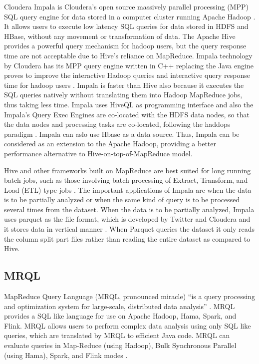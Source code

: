     Cloudera Impala is Cloudera's open source massively parallel
     processing (MPP) SQL query engine for data stored in a computer
     cluster running Apache Hadoop \cite{www-impala-cloudera}. It
     allows users to execute low latency SQL queries for data stored
     in HDFS and HBase, without any movement or transformation of
     data. The Apache Hive provides a powerful query mechanism for
     hadoop users, but the query response time are not acceptable due
     to Hive's reliance on MapReduce. Impala technology by Cloudera
     has its MPP query engine written in C++ replacing the Java engine
     proves to improve the interactive Hadoop queries and interactive
     query response time for hadoop users \cite{www-impala-dummies}
     . Impala is faster than Hive also because it executes the SQL
     queries natively without translating them into Hadoop MapReduce
     jobs, thus taking less time. Impala uses HiveQL as programming
     interface and also the Impala's Query Exec Engines are co-located
     with the HDFS data nodes, so that the data nodes and processing
     tasks are co-located, following the haddops paradigm
     \cite{www-impala-dummies}.  Impala can aslo use Hbase as a data
     source. Thus, Impala can be considered as an extension to the
     Apache Hadoop, providing a better performance alternative to
     Hive-on-top-of-MapReduce model.

     Hive and other frameworks built on MapReduce are best suited for
     long running batch jobs, such as those involving batch processing
     of Extract, Transform, and Load (ETL) type jobs
     \cite{www-impala-cloudera}.  The important applications of
     Impala are when the data is to be partially analyzed or when the
     same kind of query is to be processed several times from the
     dataset. When the data is to be partially analyzed, Impala uses
     parquet as the file format, which is developed by Twitter and
     Cloudera and it stores data in vertical manner
     \cite{www-impala-beginner}. When Parquet queries the dataset it
     only reads the column split part files rather than reading the
     entire dataset as compared to Hive.
     
\subsection{MRQL}

     MapReduce Query Language (MRQL, pronounced miracle) ``is a query
     processing and optimization system for large-scale, distributed
     data analysis'' \cite{www-apachemrql}. MRQL provides a SQL
     like language for use on Apache Hadoop, Hama, Spark, and Flink.
     MRQL allows users to perform complex data analysis using only SQL
     like queries, which are translated by MRQL to efficient Java
     code. MRQL can evaluate queries in Map-Reduce (using Hadoop), Bulk
     Synchronous Parallel (using Hama), Spark, and Flink modes
     \cite{www-apachemrql}.

